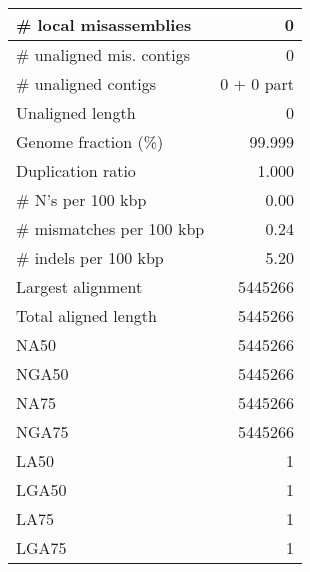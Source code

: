 \documentclass[12pt,a4paper]{article}
\begin{document}
\begin{table}[ht]
\begin{center}
\begin{tabular}{|l*{1}{|r}|}
\# local misassemblies & 0 \\ \hline
\# unaligned mis. contigs & 0 \\ \hline
\# unaligned contigs & 0 + 0 part \\ \hline
Unaligned length & 0 \\ \hline
Genome fraction (\%) & 99.999 \\ \hline
Duplication ratio & 1.000 \\ \hline
\# N's per 100 kbp & 0.00 \\ \hline
\# mismatches per 100 kbp & 0.24 \\ \hline
\# indels per 100 kbp & 5.20 \\ \hline
Largest alignment & 5445266 \\ \hline
Total aligned length & 5445266 \\ \hline
NA50 & 5445266 \\ \hline
NGA50 & 5445266 \\ \hline
NA75 & 5445266 \\ \hline
NGA75 & 5445266 \\ \hline
LA50 & 1 \\ \hline
LGA50 & 1 \\ \hline
LA75 & 1 \\ \hline
LGA75 & 1 \\ \hline
\end{tabular}
\end{center}
\end{table}
\end{document}
